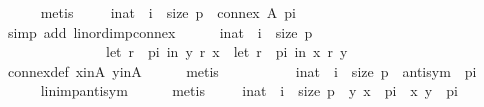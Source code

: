 \begin{isabellebody}
\ \ \ \ \isamarkupfalse%
\ metis\isanewline
\ \ \isamarkupfalse%
\ {\isachardoublequoteopen}{\isasymforall}\ i{\isacharcolon}{\kern0pt}{\isacharcolon}{\kern0pt}nat\ {\isachardot}{\kern0pt}\ i\ {\isacharless}{\kern0pt}\ size\ p\ {\isasymlongrightarrow}\ connex\ A\ {\isacharparenleft}{\kern0pt}p{\isacharbang}{\kern0pt}i{\isacharparenright}{\kern0pt}{\isachardoublequoteclose}\isanewline
\ \ \ \ \isamarkupfalse%
\ {\isacharparenleft}{\kern0pt}simp\ add{\isacharcolon}{\kern0pt}\ lin{\isacharunderscore}{\kern0pt}ord{\isacharunderscore}{\kern0pt}imp{\isacharunderscore}{\kern0pt}connex{\isacharparenright}{\kern0pt}\isanewline
\ \ \isamarkupfalse%
\ {}{\isacharcolon}{\kern0pt}\ {\isachardoublequoteopen}{\isasymforall}\ i{\isacharcolon}{\kern0pt}{\isacharcolon}{\kern0pt}nat\ {\isachardot}{\kern0pt}\ i\ {\isacharless}{\kern0pt}\ size\ p\ {\isasymlongrightarrow}\isanewline
\ \ \ \ \ \ \ \ \ \ \ \ \ \ {\isasymnot}\ {\isacharparenleft}{\kern0pt}let\ r\ {\isacharequal}{\kern0pt}\ {\isacharparenleft}{\kern0pt}p{\isacharbang}{\kern0pt}i{\isacharparenright}{\kern0pt}\ in\ {\isacharparenleft}{\kern0pt}y\ {\isasympreceq}\isactrlsub r\ x{\isacharparenright}{\kern0pt}{\isacharparenright}{\kern0pt}\ {\isasymlongrightarrow}\ {\isacharparenleft}{\kern0pt}let\ r\ {\isacharequal}{\kern0pt}\ {\isacharparenleft}{\kern0pt}p{\isacharbang}{\kern0pt}i{\isacharparenright}{\kern0pt}\ in\ {\isacharparenleft}{\kern0pt}x\ {\isasympreceq}\isactrlsub r\ y{\isacharparenright}{\kern0pt}{\isacharparenright}{\kern0pt}{\isachardoublequoteclose}\isanewline
\ \ \ \ \isamarkupfalse%
\ connex{\isacharunderscore}{\kern0pt}def\ x{\isacharunderscore}{\kern0pt}in{\isacharunderscore}{\kern0pt}A\ y{\isacharunderscore}{\kern0pt}in{\isacharunderscore}{\kern0pt}A\isanewline
\ \ \ \ \isamarkupfalse%
\ metis\isanewline
\ \ \isamarkupfalse%
\ {}\ \isamarkupfalse%
\isanewline
\ \ \ \ {\isachardoublequoteopen}{\isasymforall}\ i{\isacharcolon}{\kern0pt}{\isacharcolon}{\kern0pt}nat\ {\isachardot}{\kern0pt}\ i\ {\isacharless}{\kern0pt}\ size\ p\ {\isasymlongrightarrow}\ antisym\ \ {\isacharparenleft}{\kern0pt}p{\isacharbang}{\kern0pt}i{\isacharparenright}{\kern0pt}{\isachardoublequoteclose}\isanewline
\ \ \ \ \isamarkupfalse%
\ lin{\isacharunderscore}{\kern0pt}imp{\isacharunderscore}{\kern0pt}antisym\isanewline
\ \ \ \ \isamarkupfalse%
\ metis\isanewline
\ \ \isamarkupfalse%
\ {\isachardoublequoteopen}{\isasymforall}\ i{\isacharcolon}{\kern0pt}{\isacharcolon}{\kern0pt}nat\ {\isachardot}{\kern0pt}\ i\ {\isacharless}{\kern0pt}\ size\ p\ {\isasymlongrightarrow}\ {\isacharparenleft}{\kern0pt}{\isacharparenleft}{\kern0pt}y{\isacharcomma}{\kern0pt}\ x{\isacharparenright}{\kern0pt}\ {\isasymin}\ {\isacharparenleft}{\kern0pt}p{\isacharbang}{\kern0pt}i{\isacharparenright}{\kern0pt}\ {\isasymlongrightarrow}\ {\isacharparenleft}{\kern0pt}x{\isacharcomma}{\kern0pt}\ y{\isacharparenright}{\kern0pt}\ {\isasymnotin}\ {\isacharparenleft}{\kern0pt}p{\isacharbang}{\kern0pt}i{\isacharparenright}{\kern0pt}{\isacharparenright}{\kern0pt}{\isachardoublequoteclose}\isanewline

\end{isabellebody}
